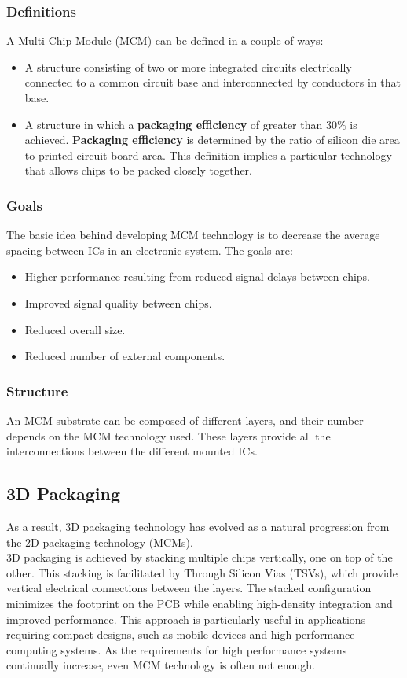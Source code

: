 \documentclass{report}
\begin{document}
\subsubsection{Definitions}
A Multi-Chip Module (MCM) can be defined in a couple of ways:
\begin{itemize}
    \item A structure consisting of two or more integrated circuits electrically connected to a common circuit base and interconnected by conductors in that base.
    \item A structure in which a \textbf{packaging efficiency} of greater than $30\%$ is achieved. \textbf{Packaging efficiency} is determined by the ratio of silicon die area to printed circuit board area. This definition implies a particular technology that allows chips to be packed closely together.
\end{itemize}

\subsubsection{Goals}
The basic idea behind developing MCM technology is to decrease the average spacing between ICs in an electronic system. The goals are:
\begin{itemize}
    \item Higher performance resulting from reduced signal delays between chips.
    \item Improved signal quality between chips.
    \item Reduced overall size.
    \item Reduced number of external components.
\end{itemize}

\subsubsection{Structure}
An MCM substrate can be composed of different layers, and their number depends on the MCM technology used. These layers provide all the interconnections between the different mounted ICs.


\subsection{3D Packaging}
As a result, 3D packaging technology has evolved as a natural progression from the 2D packaging technology (MCMs).\\
3D packaging is achieved by stacking multiple chips vertically, one on top of the other. This stacking is facilitated by Through Silicon Vias (TSVs), which provide vertical electrical connections between the layers. The stacked configuration minimizes the footprint on the PCB while enabling high-density integration and improved performance. This approach is particularly useful in applications requiring compact designs, such as mobile devices and high-performance computing systems.
As the requirements for high performance systems continually increase, even MCM technology is often not enough. 
\end{document}
